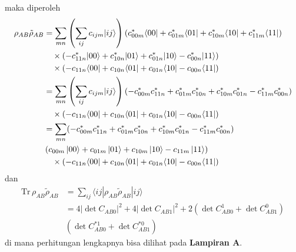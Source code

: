 maka diperoleh
\begin{equation}
	\begin{aligned}
		\rho_{AB} \tilde{\rho}_{AB}
		&= \sum_{m n}
		\left(
		\sum_{i j} c_{i j m} | i j \rangle
		\right)
		\left(
		c^{*}_{00m} \langle 00|
		+ c^{*}_{01m} \langle 01|
		+ c^{*}_{10m} \langle 10|
		+ c^{*}_{11m} \langle 11|
		\right) \\
		&\quad \times
		\left(
		- c^{*}_{11n} |00\rangle
		+ c^{*}_{10n} |01\rangle
		+ c^{*}_{01n} |10\rangle
		- c^{*}_{00n} |11\rangle
		\right) \\
		&\quad \times
		\left(
		- c_{11n} \langle 00|
		+ c_{10n} \langle 01|
		+ c_{01n} \langle 10|
		- c_{00n} \langle 11|
		\right)\\
		&= \sum_{m n}
		\left(
		\sum_{i j} c_{i j m} | i j \rangle
		\right)
		\left(
		- c^{*}_{00m} c^{*}_{11n}
		+ c^{*}_{01m} c^{*}_{10n}
		+ c^{*}_{10m} c^{*}_{01n}
		- c^{*}_{11m} c^{*}_{00n}
		\right) \\
		&\quad \times
		\left(
		- c_{11n} \langle 00|
		+ c_{10n} \langle 01|
		+ c_{01n} \langle 10|
		- c_{00n} \langle 11|
		\right)\\
		&= \sum_{m n}
		(- c^{*}_{00m} c^{*}_{11n}
		+ c^{*}_{01m} c^{*}_{10n}
		+ c^{*}_{10m} c^{*}_{01n}
		- c^{*}_{11m} c^{*}_{00n})\\
		&\left(
		c_{00m} \ket{00}
		+ c_{01m} \ket{01}
		+ c_{10m} \ket{10}
		- c_{11m} \ket{11}
		\right) \\
		&\quad \times
		\left(
		- c_{11n} \langle 00|
		+ c_{10n} \langle 01|
		+ c_{01n} \langle 10|
		- c_{00n} \langle 11|
		\right)
	\end{aligned}
\end{equation}
dan
\begin{equation}
	\begin{aligned}
		\mathrm{Tr}\,\rho_{AB} \tilde{\rho}_{AB}
		&= \sum_{i j}
		\langle i j |
		\rho_{AB} \tilde{\rho}_{AB}
		| i j \rangle \\
		&= 4 |\det C_{AB0}|^2
		+ 4 |\det C_{AB1}|^2
		+ 2 (\det C_{AB0}^1 + \det C_{AB1}^0)\\
		&(\det C^{*1}_{AB0} + \det C^{*0}_{AB1})
	\end{aligned}
\end{equation}
di mana perhitungan lengkapnya bisa dilihat pada \textbf{Lampiran A}.

